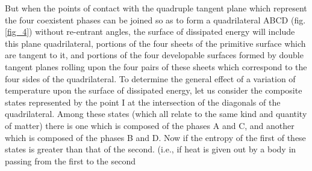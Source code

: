 \documentclass[12pt]{article}
\begin{document}
But when the points of contact with the quadruple tangent plane which represent the four coexistent phases can be joined so as to form a quadrilateral ABCD (fig. \ref{fig_4}) without re-entrant angles, the surface of dissipated energy will include this plane quadrilateral, portions of the four sheets of the primitive surface which are tangent to it, and portions of the four developable surfaces formed by double tangent planes rolling upon the four pairs of these sheets which correspond to the four sides of the quadrilateral. To determine the general effect of a variation of temperature upon the surface of dissipated energy, let us consider the composite states represented by the point I at the intersection of the diagonals of the quadrilateral. Among these states (which all relate to the same kind and quantity of matter) there is one which is composed of the phases A and C, and another which is composed of the phases B and D. Now if the entropy of the first of these states is greater than that of the second. (i.e., if heat is given out by a body in passing from the first to the second
\end{document}
